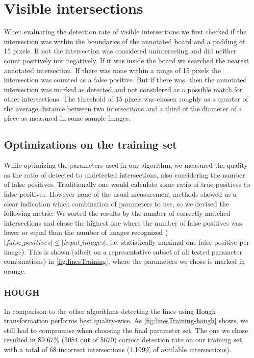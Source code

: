 	\section{Visible intersections}
	\label{evaluation-visible}
	When evaluating the detection rate of visible intersections we first checked if the intersection was within the boundaries of the annotated board and a padding of 15 pixels. If not the intersection was considered uninteresting and did neither count positively nor negatively. If it was inside the board we searched the nearest annotated intersection. If there was none within a range of 15 pixels the intersection was counted as a false positive. But if there was, then the annotated intersection was marked as detected and not considered as a possible match for other intersections. The threshold of 15 pixels was chosen roughly as a quarter of the average distance between two intersections and a third of the diameter of a piece as measured in some sample images.

	

	\subsection{Optimizations on the training set}
	\label{evaluation-visible-optimization}
	While optimizing the parameters used in our algorithm, we measured the quality as the ratio of detected to undetected intersections, also considering the number of false positives. Traditionally one would calculate some ratio of true positives to false positives. However none of the usual measurement methods showed us a clear indication which combination of parameters to use, so we devised the following metric: We sorted the results by the number of correctly matched intersections and chose the highest one where the number of false positives was lower or equal than the number of images recognized ($|false\_positives| \leq |input\_images|$, i.e. statistically maximal one false positive per image). This is shown (albeit on a representative subset of all tested parameter combinations) in \autoref{fig:linesTraining}, where the parameters we chose is marked in orange.

	\subsubsection{HOUGH}
	\label{evaluation-visible-optimization-hough}
	In comparison to the other algorithms detecting the lines using Hough transformation performs best quality-wise. As \autoref{fig:linesTraining-hough} shows, we still had to compromise when choosing the final parameter set. The one we chose resulted in 89.67\% (5084 out of 5670) correct detection rate on our training set, with a total of 68 incorrect intersections (1.199\% of available intersections).


